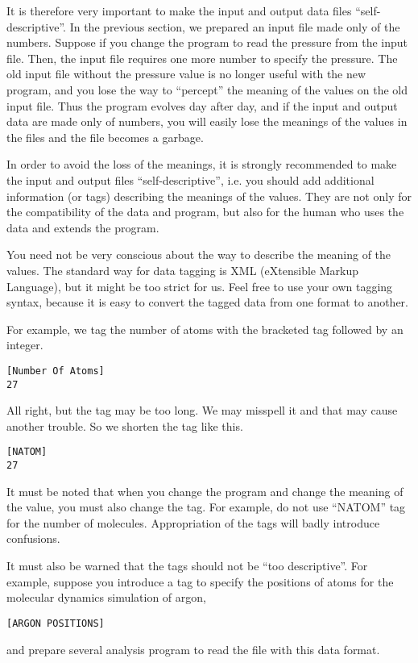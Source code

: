 \documentclass[a4,10pt]{article}
\begin{document}
It is therefore very important to make the input and output data files ``self-descriptive''.  In the previous section, we prepared an input file made only of the numbers.  Suppose if you change the program to read the pressure from the input file.  Then, the input file requires one more number to specify the pressure.  The old input file without the pressure value is no longer useful with the new program, and you lose the way to ``percept'' the meaning of the values on the old input file.  Thus the program evolves day after day, and if the input and output data are made only of numbers, you will easily lose the meanings of the values in the files and the file becomes a garbage.

In order to avoid the loss of the meanings, it is strongly recommended to make the input and output files ``self-descriptive'', i.e. you should add additional information (or tags) describing the meanings of the values.  They are not only for the compatibility of the data and program, but also for the human who uses the data and extends the program.

You need not be very conscious about the way to describe the meaning of the values.  The standard way for data tagging is XML (eXtensible Markup Language), but it might be too strict for us.  Feel free to use your own tagging syntax, because it is easy to convert the tagged data from one format to another.  

For example, we tag the number of atoms with the bracketed tag followed by an integer.
\begin{screen}\begin{verbatim}
[Number Of Atoms]
27
\end{verbatim}\end{screen}
All right, but the tag may be too long. We may misspell it and that may cause another trouble.  So we shorten the tag like this.
\begin{screen}\begin{verbatim}
[NATOM]
27
\end{verbatim}\end{screen}

It must be noted that when you change the program and change the meaning of the value, you must also change the tag.  For example, do not use ``NATOM'' tag for the number of molecules.  Appropriation of the tags will badly introduce confusions.

It must also be warned that the tags should not be ``too descriptive''.  For example, suppose you introduce a tag to specify the positions of atoms for the molecular dynamics simulation of argon,
\begin{screen}\begin{verbatim}
[ARGON POSITIONS]
\end{verbatim}\end{screen}
and prepare several analysis program to read the file with this data format.
\end{document}
